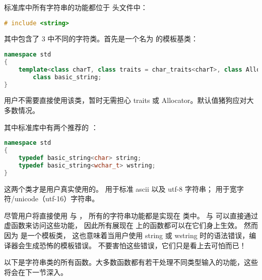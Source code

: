 \documentclass[../../LearnCpp.tex]{subfiles}
\begin{document}
标准库中所有字符串的功能都位于  头文件中：

\begin{lstlisting}[language=C++]
# include <string>
\end{lstlisting}

其中包含了 3 中不同的字符类。首先是一个名为  的模板基类：

\begin{lstlisting}[language=C++]
namespace std
{
    template<class charT, class traits = char_traits<charT>, class Allocator = allocator<charT> >
        class basic_string;
}
\end{lstlisting}

用户不需要直接使用该类，暂时无需担心 traits 或 Allocator。默认值猪狗应对大多数情况。

其中标准库中有两个推荐的 ：

\begin{lstlisting}[language=C++]
namespace std
{
    typedef basic_string<char> string;
    typedef basic_string<wchar_t> wstring;
}
\end{lstlisting}

这两个类才是用户真实使用的。 用于标准 ascii 以及 utf-8 字符串；
 用于宽字符/unicode（utf-16）字符串。

尽管用户将直接使用  与 ，
所有的字符串功能都是实现在  类中。
 与  可以直接通过虚函数来访问这些功能，
因此所有展现在  上的函数都可以在它们身上生效。
然而因为  是一个模板类，
这也意味着当用户使用 string 或 wstring 时的语法错误，编译器会生成恐怖的模板错误。
不要害怕这些错误，它们只是看上去可怕而已！

以下是字符串类的所有函数。大多数函数都有若干处理不同类型输入的功能，这些将会在下一节深入。
\end{document}
